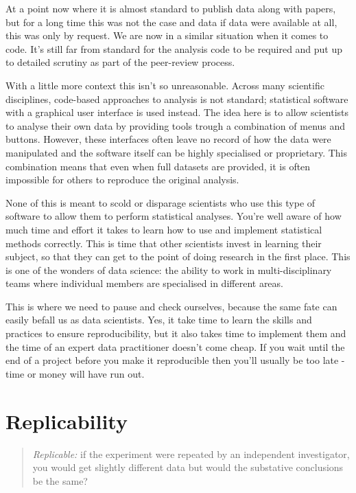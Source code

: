\documentclass[
  12pt,
]{book}
\begin{document}
At a point now where it is almost standard to publish data along with papers, but for a long time this was not the case and data if data were available at all, this was only by request. We are now in a similar situation when it comes to code. It's still far from standard for the analysis code to be required and put up to detailed scrutiny as part of the peer-review process.

With a little more context this isn't so unreasonable. Across many scientific disciplines, code-based approaches to analysis is not standard; statistical software with a graphical user interface is used instead. The idea here is to allow scientists to analyse their own data by providing tools trough a combination of menus and buttons. However, these interfaces often leave no record of how the data were manipulated and the software itself can be highly specialised or proprietary. This combination means that even when full datasets are provided, it is often impossible for others to reproduce the original analysis.

None of this is meant to scold or disparage scientists who use this type of software to allow them to perform statistical analyses. You're well aware of how much time and effort it takes to learn how to use and implement statistical methods correctly. This is time that other scientists invest in learning their subject, so that they can get to the point of doing research in the first place. This is one of the wonders of data science: the ability to work in multi-disciplinary teams where individual members are specialised in different areas.

This is where we need to pause and check ourselves, because the same fate can easily befall us as data scientists. Yes, it take time to learn the skills and practices to ensure reproducibility, but it also takes time to implement them and the time of an expert data practitioner doesn't come cheap. If you wait until the end of a project before you make it reproducible then you'll usually be too late - time or money will have run out.

\hypertarget{replicability}{%
\section{Replicability}\label{replicability}}

\begin{quote}
\emph{Replicable:} if the experiment were repeated by an independent investigator, you would get slightly different data but would the substative conclusions be the same?
\end{quote}
\end{document}

